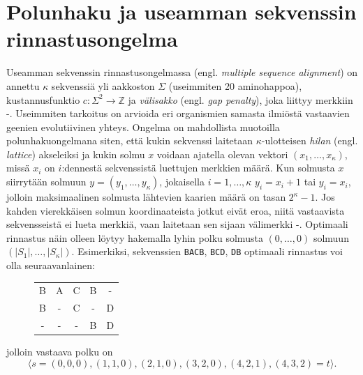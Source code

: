 \documentclass[finnish]{tktltiki2}
\theoremstyle{definition}
\theoremstyle{remark}
\begin{document}
\section{Polunhaku ja useamman sekvenssin rinnastusongelma}
Useamman sekvenssin rinnastusongelmassa (engl. \textit{multiple sequence alignment}) on annettu $\kappa$ sekvenssiä yli aakkoston $\Sigma$ (useimmiten 20 aminohappoa), kustannusfunktio $c \colon \Sigma^2 \to \mathbb{Z}$ ja \textit{välisakko} (engl. \textit{gap penalty}), joka liittyy merkkiin -. Useimmiten tarkoitus on arvioida eri organismien samasta ilmiöstä vastaavien geenien evolutiivinen yhteys.  Ongelma on mahdollista muotoilla polunhakuongelmana siten, että kukin sekvenssi laitetaan $\kappa$-ulotteisen \textit{hilan} (engl. \textit{lattice}) akseleiksi ja kukin solmu $x$ voidaan ajatella olevan vektori $(x_1, \dots, x_\kappa)$, missä $x_i$ on $i$:dennestä sekvenssistä luettujen merkkien määrä. Kun solmusta $x$ siirrytään solmuun $y = (y_1, \dots, y_\kappa)$, jokaisella $i = 1, \dots, \kappa$ $y_i = x_i + 1$ tai $y_i = x_i$, jolloin maksimaalinen solmusta lähtevien kaarien määrä on tasan $2^\kappa - 1$. Jos kahden vierekkäisen solmun koordinaateista jotkut eivät eroa, niitä vastaavista sekvensseistä ei lueta merkkiä, vaan laitetaan sen sijaan välimerkki -. Optimaali rinnastus näin olleen löytyy hakemalla lyhin polku solmusta $(0, \dots, 0)$ solmuun $(|S_1|, \dots, |S_\kappa|)$. Esimerkiksi, sekvenssien \texttt{BACB}, \texttt{BCD}, \texttt{DB} optimaali rinnastus voi olla seuraavanlainen:
\begin{figure}[H]
\centering
\begin{tabular}{ccccc}
B & A & C & B & - \\
B & - & C & - & D \\
- & - & - & B & D
\end{tabular}
\end{figure}
jolloin vastaava polku on
\[ 
\langle s = (0, 0, 0), (1, 1, 0), (2, 1, 0), (3, 2, 0), (4, 2, 1), (4, 3, 2) = t \rangle.
\]
\end{document}
